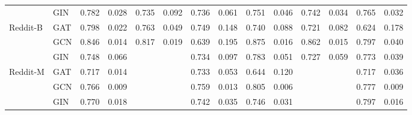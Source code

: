 \begin{tabular}{llrrrrrrrrrrrr}
 & GIN & 0.782 & 0.028 & 0.735 & 0.092 & 0.736 & 0.061 & 0.751 & 0.046 & 0.742 & 0.034 & 0.765 & 0.032 \\
\cline{1-14}
\multirow[t]{3}{*}{Reddit-B} & GAT & 0.798 & 0.022 & 0.763 & 0.049 & 0.749 & 0.148 & 0.740 & 0.088 & 0.721 & 0.082 & 0.624 & 0.178 \\
 & GCN & 0.846 & 0.014 & 0.817 & 0.019 & 0.639 & 0.195 & 0.875 & 0.016 & 0.862 & 0.015 & 0.797 & 0.040 \\
 & GIN & 0.748 & 0.066 &  &  & 0.734 & 0.097 & 0.783 & 0.051 & 0.727 & 0.059 & 0.773 & 0.039 \\
\cline{1-14}
\multirow[t]{3}{*}{Reddit-M} & GAT & 0.717 & 0.014 &  &  & 0.733 & 0.053 & 0.644 & 0.120 &  &  & 0.717 & 0.036 \\
 & GCN & 0.766 & 0.009 &  &  & 0.759 & 0.013 & 0.805 & 0.006 &  &  & 0.777 & 0.009 \\
 & GIN & 0.770 & 0.018 &  &  & 0.742 & 0.035 & 0.746 & 0.031 &  &  & 0.797 & 0.016 \\
\bottomrule
\end{tabular}
